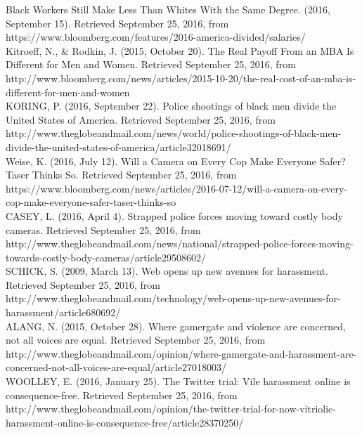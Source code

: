 \documentclass{article}
\begin{document}
\noindent
[9] Black Workers Still Make Less Than Whites With the Same Degree. (2016, September 15). Retrieved September 25, 2016, from https://www.bloomberg.com/features/2016-america-divided/salaries/\\

\noindent
[10] Kitroeff, N., \& Rodkin, J. (2015, October 20). The Real Payoff From an MBA Is Different for Men and Women. Retrieved September 25, 2016, from http://www.bloomberg.com/news/articles/2015-10-20/the-real-cost-of-an-mba-is-different-for-men-and-women\\

\noindent
[11] KORING, P. (2016, September 22). Police shootings of black men divide the United States of America. Retrieved September 25, 2016, from \\
http://www.theglobeandmail.com/news/world/police-shootings-of-black-men-divide-the-united-states-of-america/article32018691/\\

\noindent
[12] Weise, K. (2016, July 12). Will a Camera on Every Cop Make Everyone Safer? Taser Thinks So. Retrieved September 25, 2016, from \\
https://www.bloomberg.com/news/articles/2016-07-12/will-a-camera-on-every-cop-make-everyone-safer-taser-thinks-so\\

\noindent
[13] CASEY, L. (2016, April 4). Strapped police forces moving toward costly body cameras. Retrieved September 25, 2016, from \\
http://www.theglobeandmail.com/news/national/strapped-police-forces-moving-towards-costly-body-cameras/article29508602/\\

\noindent
[14] SCHICK, S. (2009, March 13). Web opens up new avenues for harassment. Retrieved September 25, 2016, from http://www.theglobeandmail.com/technology/web-opens-up-new-avenues-for-harassment/article680692/\\

\noindent
[15] ALANG, N. (2015, October 28). Where gamergate and violence are concerned, not all voices are equal. Retrieved September 25, 2016, from \\
http://www.theglobeandmail.com/opinion/where-gamergate-and-harassment-are-concerned-not-all-voices-are-equal/article27018003/\\

\noindent
[16] WOOLLEY, E. (2016, January 25). The Twitter trial: Vile harassment online is consequence-free. Retrieved September 25, 2016, from \\
http://www.theglobeandmail.com/opinion/the-twitter-trial-for-now-vitriolic-harassment-online-is-consequence-free/article28370250/\\
\end{document}
